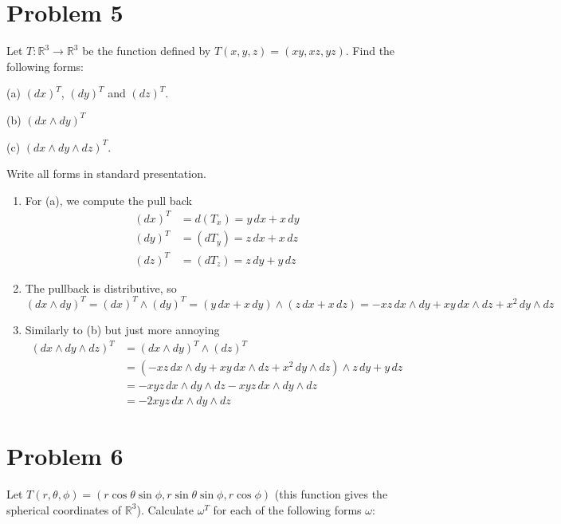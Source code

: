 \documentclass[11pt]{article}
\begin{document}
\section*{Problem 5}

Let $T : \mathbb{R}^3 \to \mathbb{R}^3$ be the function defined by $T (x, y, z) = (xy, xz, yz)$. Find the following forms:

(a) $(dx)^T$, $(dy)^T$ and $(dz)^T$.

(b) $(dx \wedge dy)^T$

(c) $(dx \wedge dy \wedge dz)^T$.

Write all forms in standard presentation.
\begin{solution}
    \begin{enumerate}
        \item For (a), we compute the pull back
        \begin{align*}
            (dx)^T &= d(T_x) = y\, dx + x\,dy\\
            (dy)^T &= (dT_y) = z\,dx + x\,dz\\
            (dz)^T &= (dT_z) = z\,dy + y\,dz
        \end{align*}
        \item The pullback is distributive, so
        \[(dx \wedge dy)^T = (dx)^T \wedge (dy)^T = (y\, dx + x\,dy) \wedge (z\,dx + x\,dz) = -xz \,dx \wedge dy + xy\, dx\wedge dz + x^2 \, dy\wedge dz\]
        \item Similarly to (b) but just more annoying
        \begin{align*}
            (dx \wedge dy \wedge dz)^T &= (dx \wedge dy )^T\wedge (dz)^T\\
            &= (-xz \,dx \wedge dy + xy\, dx\wedge dz + x^2 \, dy\wedge dz)\wedge z\,dy + y\,dz\\
            &= -xyz\,dx \wedge dy\wedge dz - xyz\, dx\wedge dy\wedge dz\\
            &= -2xyz\, dx\wedge dy\wedge dz
        \end{align*}
    \end{enumerate}
\end{solution}

\newpage

\section*{Problem 6}

Let $T (r, \theta, \phi) = (r \cos \theta \sin\phi, r \sin \theta \sin\phi, r \cos\phi)$ (this function gives the spherical coordinates of $\mathbb{R}^3$). Calculate $\omega^T$ for each of the following forms $\omega$:
\end{document}
